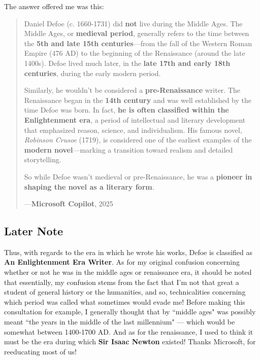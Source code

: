 \documentclass[a4paper]{article}
\begin{document}
The answer \cite{copilot_assistant} offered me was this:


\noindent
\begin{minipage}{1\textwidth}
\vspace{1em}
\begin{quotation}
{\ttfamily

Daniel Defoe (c. 1660-1731) did \textbf{not} live during the Middle Ages. The Middle Ages, or \textbf{medieval period}, generally refers to the time between the \textbf{5th and late 15th centuries}---from the fall of the Western Roman Empire (476 AD) to the beginning of the Renaissance (around the late 1400s). Defoe lived much later, in the \textbf{late 17th and early 18th centuries}, during the early modern period.

Similarly, he wouldn’t be considered a \textbf{pre-Renaissance} writer. The Renaissance began in the \textbf{14th century} and was well established by the time Defoe was born. In fact, \textbf{he is often classified within the \textbf{Enlightenment era}}, a period of intellectual and literary development that emphasized reason, science, and individualism. His famous novel, \textit{Robinson Crusoe} (1719), is considered one of the earliest examples of the \textbf{modern novel}---marking a transition toward realism and detailed storytelling.

So while Defoe wasn’t medieval or pre-Renaissance, he was a \textbf{pioneer in shaping the novel as a literary form}. 

}
\hspace*{\fill} ---\textbf{Microsoft Copilot}, 2025\cite{copilot_assistant}
\end{quotation}
\vspace{1em}
\end{minipage}


\subsection{Later Note}


Thus, with regards to the era in which he wrote his works, Defoe is classified as \textbf{An Enlightenment Era Writer}. As for my original confusion concerning whether or not he was in the middle ages or renaissance era, it should be noted that essentially, my confusion stems from the fact that I'm not that great a student of general history or the humanities, and so, technicalities concerning which period was called what sometimes would evade me! Before making this consultation for example, I generally thought that by ``middle ages" was possibly meant ``the years in the middle of the last millennium" --- which would be somewhat between 1400-1700 AD. And as for the renaissance, I used to think it must be the era during which \textbf{Sir Isaac Newton} existed! Thanks Microsoft, for reeducating most of us!
\end{document}
